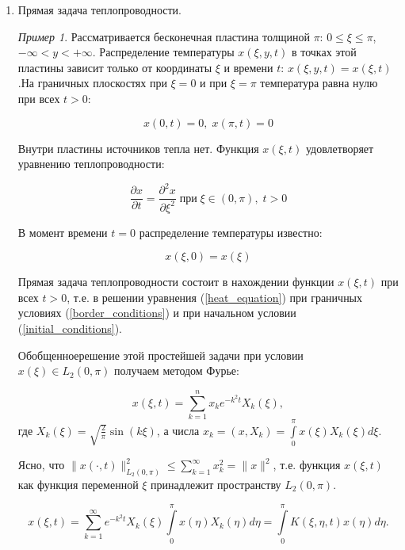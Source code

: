 \documentclass[12pt,a4paper,titlepage]{book}
\theoremstyle{definition}
\theoremstyle{plain}
\theoremstyle{remark}
\theoremstyle{remark}
\newtheorem*{example}{Пример}
\theoremstyle{remark}
\theoremstyle{plain}
\begin{document}
\begin{enumerate}

\item Прямая задача теплопроводности.
\begin{example}
Рассматривается бесконечная пластина толщиной $\pi$: $0 \leq \xi \leq\pi$, $-\infty < y < +\infty$. Распределение температуры $x(\xi, y, t)$ в точках этой пластины зависит только от координаты $\xi$ и времени $t$: $x(\xi, y, t) = x(\xi, t)$.На граничных плоскостях при $\xi = 0$ и при $\xi = \pi$ температура равна нулю при всех $t > 0$:
\end{example}

\begin{equation}
\label{border_conditions}
x(0, t) = 0,\;  x(\pi, t) = 0
\end{equation}

Внутри пластины источников тепла нет. Функция $x(\xi, t)$ удовлетворяет уравнению теплопроводности:

\begin{equation}
\label{heat_equation}
\frac{\partial x}{\partial t} = \frac{\partial^2 x}{\partial \xi^2} \;  \mbox{при} \;   \xi \in (0, \pi),\;  t > 0
\end{equation}

В момент времени $t = 0$ распределение температуры известно: 

\begin{equation}
\label{initial_conditions}
x(\xi,0)=x(\xi)
\end{equation}

Прямая задача теплопроводности состоит в нахождении функции $x(\xi,t)$ при всех $t >0$, т.е. в решении уравнения (\ref{heat_equation}) при граничных условиях (\ref{border_conditions}) и при начальном условии (\ref{initial_conditions}).

\guillemotleft Обобщенное\guillemotright \;решение этой простейшей задачи при условии $x(\xi) \in L_2(0, \pi)$ получаем методом Фурье:
\begin{center}
$$x(\xi,t) = \sum\limits_{k=1}^n x_k e^{-k^2t} X_k(\xi),$$ где $X_k(\xi) = \sqrt{\frac{2}{\pi}} \sin (k\xi)$, а числа $x_k = (x,X_k) = \displaystyle\int\limits_0^\pi x(\xi) X_k(\xi) d\xi\mbox{.}$
\end{center}

Ясно, что $\|x(\cdot, t)\|_{L_2 (0, \pi)}^{2} \leq \sum\limits_{k=1}^{\infty}x_k^2=\|x\|^2$, т.е. функция $x(\xi,t)$ как функция переменной $\xi$ принадлежит пространству $L_2 (0, \pi)$.
\begin{center}
$$x(\xi, t) = \sum\limits_{k=1}^{\infty} e^{-k^2 t} X_k(\xi) \int\limits_{0}^{\pi} x(\eta) X_k(\eta) d\eta = \int\limits_{0}^{\pi} K(\xi, \eta, t) x(\eta) d \eta \mbox{.}$$
\end{center}


\end{enumerate}
\end{document}
